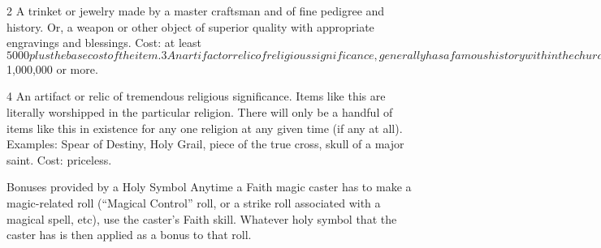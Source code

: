 \documentclass[twoside]{book}
\begin{document}
                  
                   2   
                     A trinket or jewelry made by a master
                     craftsman and of fine pedigree and history. Or, a
                     weapon or other object of superior quality with
                     appropriate engravings and blessings. 
                     Cost: at least $5000 plus the base cost of the
                     item. 
                  
                  
                   3   
                     An artifact or relic of religious
                     significance, generally has a famous history within
                     the church, or a Legendary quality weapon blessed by
                     a member of the church with Faith: 7 or higher.
                     
                   Cost: $1,000,000 or more.   
                  
                  
                   4   
                     An artifact or relic of tremendous religious
                     significance. Items like this are literally
                     worshipped in the particular religion. There will
                     only be a handful of items like this in existence
                     for any one religion at any given time (if any at
                     all). Examples: Spear of Destiny, Holy Grail, piece
                     of the true cross, skull of a major saint. 
                   Cost: priceless.   
                  
                
              Bonuses provided by a Holy Symbol  
              Anytime a Faith magic caster has to make a
               magic-related roll (“Magical Control” roll, or
               a strike roll associated with a magical spell, etc), use
               the caster’s Faith skill. Whatever holy symbol that
               the caster has is then applied as a bonus to that roll.
               
\end{document}
